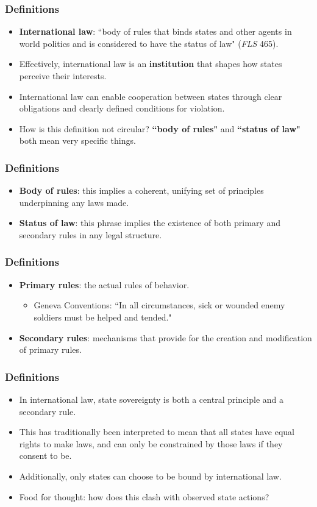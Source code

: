 \documentclass[handout]{beamer}
\begin{document}
\begin{frame} 
\frametitle{\LARGE{Definitions}}
\begin{itemize}
		\item \textbf{International law}: ``body of rules that binds states and other agents in world politics and is considered to have the status of law" (\textit{FLS} 465). \pause
		\item Effectively, international law is an \textbf{institution} that shapes how states perceive their interests.
		\item International law can enable cooperation between states through clear obligations and clearly defined conditions for violation. \pause
		\item How is this definition not circular? \pause \textbf{``body of rules"} and \textbf{``status of law"} both mean very specific things.
\end{itemize}
\end{frame}


\begin{frame} 
	\frametitle{\LARGE{Definitions}}
	\begin{itemize}
		\item \textbf{Body of rules}: this implies a coherent, unifying set of principles underpinning any laws made.
		\item \textbf{Status of law}: this phrase implies the existence of both primary and secondary rules in any legal structure. 
	\end{itemize}
\end{frame}

\begin{frame} 
	\frametitle{\LARGE{Definitions}}
	\begin{itemize}
		\item \textbf{Primary rules}: the actual rules of behavior.
		\begin{itemize}
			\item Geneva Conventions: ``In all circumstances, sick or wounded enemy soldiers must be helped and tended." \pause
		\end{itemize}
		\item \textbf{Secondary rules}: mechanisms that provide for the creation and modification of primary rules.
	\end{itemize}
\end{frame}

\begin{frame} 
	\frametitle{\LARGE{Definitions}}
	\begin{itemize}
		\item In international law, state sovereignty is both a central principle and a secondary rule. \pause
		\item This has traditionally been interpreted to mean that all states have equal rights to make laws, and can only be constrained by those laws if they consent to be. \pause
		\item Additionally, only states can choose to be bound by international law. \pause
		\item Food for thought: how does this clash with observed state actions?
	\end{itemize}
\end{frame}
\end{document}
